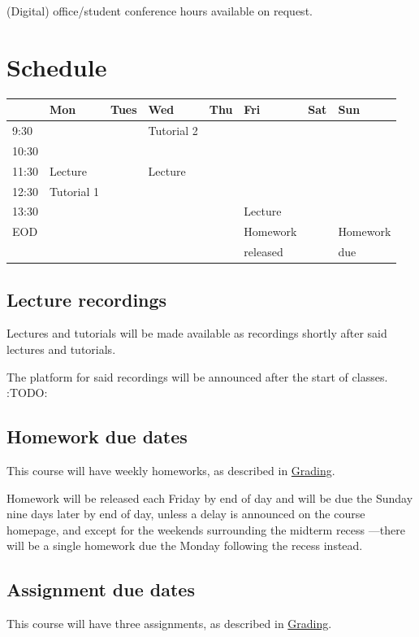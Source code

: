 \documentclass[11pt]{article}
\begin{document}
(Digital) office/student conference hours available on request.

\section{Schedule}
\label{sec:org904d4fa}
\begin{center}
\begin{tabular}{|l|l|l|l|l|l|l|l|}
\hline
 & Mon & Tues & Wed & Thu & Fri & Sat & Sun \\
\hline
9:30 & & & Tutorial 2 & & & & \\
\hline
10:30 & & & & & & & \\
\hline
11:30 & Lecture & & Lecture & & & & \\
\hline
12:30 & Tutorial 1 & & & & & & \\
\hline
13:30 & & & & & Lecture & & \\
\hline
EOD & & & & & Homework & & Homework \\
 & & & & & released & & due \\
\hline
\end{tabular}
\end{center}

\subsection{Lecture recordings}
\label{sec:org930663d}
Lectures and tutorials will be made available as recordings
shortly after said lectures and tutorials.

The platform for said recordings will be announced
after the start of classes.
:TODO:

\subsection{Homework due dates}
\label{sec:orgbefded1}
This course will have weekly homeworks, as described in \hyperref[sec:org5402ca6]{Grading}.

Homework will be released each Friday by end of day
and will be due the Sunday nine days later by end of day,
unless a delay is announced on the course homepage,
and except for the weekends surrounding the midterm recess
—there will be a single homework due
the Monday following the recess instead.

\subsection{Assignment due dates}
\label{sec:org84589d6}
This course will have three assignments, as described in \hyperref[sec:org5402ca6]{Grading}.
\end{document}
